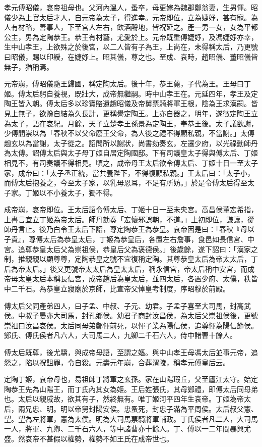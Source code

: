 \begin{pinyinscope}
孝元傅昭儀，哀帝祖母也。父河內溫人，蚤卒，母更嫁為魏郡鄭翁妻，生男惲。昭儀少為上官太后才人，自元帝為太子，得進幸。元帝即位，立為婕妤，甚有寵。為人有材略，善事人，下至宮人左右，飲酒酹地，皆祝延之。產一男一女，女為平都公主，男為定陶恭王。恭王有材藝，尤愛於上。元帝既重傅婕妤，及馮婕妤亦幸，生中山孝王，上欲殊之於後宮，以二人皆有子為王，上尚在，未得稱太后，乃更號曰昭儀，賜以印綬，在婕妤上。昭其儀，尊之也。至成、哀時，趙昭儀、董昭儀皆無子，猶稱焉。

元帝崩，傅昭儀隨王歸國，稱定陶太后。後十年，恭王薨，子代為王。王母曰丁姬。傅太后躬自養視，既壯大，成帝無繼嗣。時中山孝王在。元延四年，孝王及定陶王皆入朝。傅太后多以珍寶賂遺趙昭儀及帝舅票騎將軍王根，陰為王求漢嗣。皆見上無子，欲豫自結為久長計，更稱譽定陶王。上亦自器之，明年，遂徵定陶王立為太子，語在哀紀。月餘，天子立楚孝王孫景為定陶王，奉恭王後。太子議欲謝，少傅閻崇以為「春秋不以父命廢王父命，為人後之禮不得顧私親，不當謝。」太傅趙玄以為當謝，太子從之。詔問所以謝狀，尚書劾奏玄，左遷少府，以光祿勳師丹為太傅。詔傅太后與太子母丁姬自居定陶國邸。下有司議皇太子得與傅太后、丁姬相見不，有司奏議不得相見。頃之，成帝母王太后欲令傅太后、丁姬十日一至太子家，成帝曰：「太子丞正統，當共養陛下，不得復顧私親。」王太后曰：「太子小，而傅太后抱養之，今至太子家，以乳母恩耳，不足有所妨。」於是令傅太后得至太子家。丁姬以不小養太子，獨不得。

成帝崩，哀帝即位。王太后詔令傅太后、丁姬十日一至未央宮。高昌侯董宏希指，上書言宜立丁姬為帝太后。師丹劾奏「宏懷邪誤朝，不道。」上初即位，謙讓，從師丹言止。後乃白令王太后下詔，尊定陶恭王為恭皇。哀帝因是曰：「春秋『母以子貴』，尊傅太后為恭皇太后，丁姬為恭皇后，各置左右詹事，食邑如長信宮、中宮。追尊恭皇太后父為崇祖侯，恭皇后父為褒德侯。」後歲餘，遂下詔曰：「漢家之制，推親親以顯尊尊，定陶恭皇之號不宜復稱定陶。其尊恭皇太后為帝太太后，丁后為帝太后。」後又更號帝太太后為皇太太后，稱永信宮，帝太后稱中安宮，而成帝母太皇太后本稱長信宮，成帝趙后為皇太后，並四太后，各置少府、太僕，秩皆中二千石。為恭皇立寢廟於京師，比宣帝父悼皇考制度，序昭穆於前殿。

傅太后父同產弟四人，曰子孟、中叔、子元、幼君。子孟子喜至大司馬，封高武侯。中叔子晏亦大司馬，封孔鄉侯。幼君子商封汝昌侯，為太后父崇祖侯後，更號崇祖曰汝昌哀侯。太后同母弟鄭惲前死，以惲子業為陽信侯，追尊惲為陽信節侯。鄭氏、傅氏侯者凡六人，大司馬二人，九卿二千石六人，侍中諸曹十餘人。

傅太后既尊，後尤驕，與成帝母語，至謂之嫗。與中山孝王母馮太后並事元帝，追怨之，陷以祝詛罪，令自殺。元壽元年崩，合葬渭陵，稱孝元傅皇后云。

定陶丁姬，哀帝母也，易祖師丁將軍之玄孫。家在山陽瑕丘，父至廬江太守。始定陶恭王先為山陽王，而丁氏內其女為姬。王后姓張氏，其母鄭禮，即傅太后同母弟也。太后以親戚故，欲其有子，然終無有。唯丁姬河平四年生哀帝。丁姬為帝太后，兩兄忠、明。明以帝舅封陽安侯。忠蚤死，封忠子滿為平周侯。太后叔父憲、望。望為左將軍，憲為太僕。明為大司馬票騎將軍輔政。丁氏侯者凡二人，大司馬一人，將軍、九卿、二千石六人，等中諸曹亦十餘人。丁、傅以一二年間暴興尤盛。然哀帝不甚假以權勢，權勢不如王氏在成帝世也。


\end{pinyinscope}

